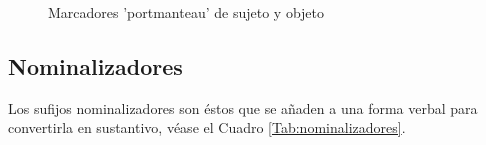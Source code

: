 \documentclass[a4paper,11pt,DIV12]{scrartcl}
\begin{document}
\begin{figure}
\caption{Marcadores 'portmanteau' de sujeto y objeto}\label{Fig:s.subjobj}
\end{figure}



  \subsection{Nominalizadores}
Los sufijos nominalizadores son \'estos que se a\~naden a una forma verbal para convertirla en sustantivo, v\'ease el Cuadro \ref{Tab:nominalizadores}.
\end{document}
